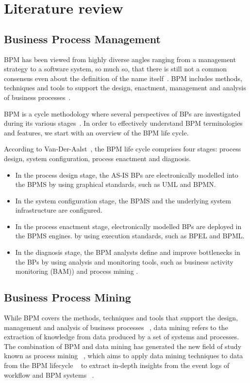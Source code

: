 \chapter{Literature review}

\section{Business Process Management}

BPM has been viewed from highly diverse angles ranging from a management strategy to a software system, so much so, that there is still not a common consensus even about the definition of the name itself~\cite{van2003workflow}. BPM includes methods, techniques and tools to support the design, enactment, management and analysis of business processes~\cite{van2003workflow}.

BPM is a cycle methodology where several perspectives of BPs are investigated during its various stages~\cite{lodhi2013business}. In order to effectively understand BPM terminologies and features, we start with an overview of the BPM life cycle.

According to Van-Der-Aalst~\cite{van2003workflow}, the BPM life cycle comprises four
stages: process design, system configuration, process enactment and diagnosis.
\begin{itemize}
    \item In the process design stage, the AS-IS BPs are electronically modelled into the BPMS by using graphical standards, such as UML and BPMN.
    \item In the system configuration stage, the BPMS and the underlying system infrastructure are configured. 
    \item In the process enactment stage, electronically modelled BPs are deployed in the BPMS engines. by using execution standards, such as BPEL and BPML.
    \item In the diagnosis stage, the BPM analysts define and improve bottlenecks in the BPs by using analysis and monitoring tools, such as business activity monitoring (BAM)) and process mining .
\end{itemize}


\section{Business Process Mining}

While BPM covers the methods, techniques and tools that support the design, management and analysis of business processes ~\cite{van2003workflow}, data mining refers to the extraction of knowledge from data produced by a set of systems and processes. The combination of BPM and data mining has generated the new field of study known as process mining ~\cite{van2011process}, which aims to apply data mining techniques to data from the BPM lifecycle ~\cite{song2008trace} to extract in-depth insights from the event logs of workflow and BPM systems ~\cite{van2003workflow}.



